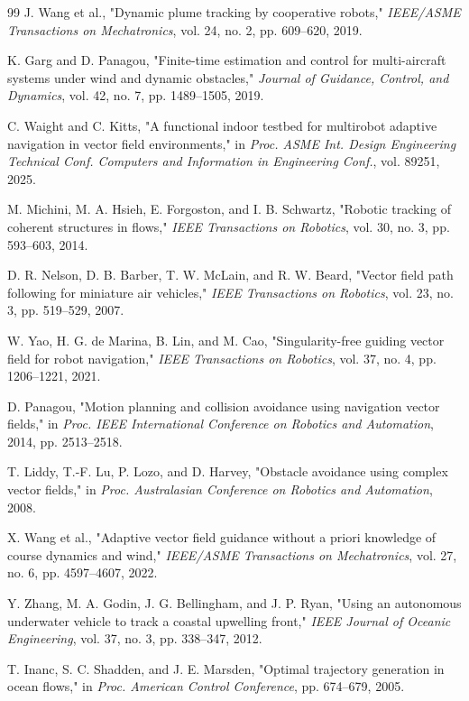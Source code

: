 \documentclass[lettersize,journal]{IEEEtran}
\begin{document}
\begin{thebibliography}{99}
 J. Wang et al., "Dynamic plume tracking by cooperative robots," \textit{IEEE/ASME Transactions on Mechatronics}, vol. 24, no. 2, pp. 609--620, 2019.

 K. Garg and D. Panagou, "Finite-time estimation and control for multi-aircraft systems under wind and dynamic obstacles," \textit{Journal of Guidance, Control, and Dynamics}, vol. 42, no. 7, pp. 1489--1505, 2019.

 C. Waight and C. Kitts, "A functional indoor testbed for multirobot adaptive navigation in vector field environments," in \textit{Proc. ASME Int. Design Engineering Technical Conf. Computers and Information in Engineering Conf.}, vol. 89251, 2025.

 M. Michini, M. A. Hsieh, E. Forgoston, and I. B. Schwartz, "Robotic tracking of coherent structures in flows," \textit{IEEE Transactions on Robotics}, vol. 30, no. 3, pp. 593--603, 2014.

 D. R. Nelson, D. B. Barber, T. W. McLain, and R. W. Beard, "Vector field path following for miniature air vehicles," \textit{IEEE Transactions on Robotics}, vol. 23, no. 3, pp. 519--529, 2007.

 W. Yao, H. G. de Marina, B. Lin, and M. Cao, "Singularity-free guiding vector field for robot navigation," \textit{IEEE Transactions on Robotics}, vol. 37, no. 4, pp. 1206--1221, 2021.

 D. Panagou, "Motion planning and collision avoidance using navigation vector fields," in \textit{Proc. IEEE International Conference on Robotics and Automation}, 2014, pp. 2513--2518.

 T. Liddy, T.-F. Lu, P. Lozo, and D. Harvey, "Obstacle avoidance using complex vector fields," in \textit{Proc. Australasian Conference on Robotics and Automation}, 2008.

 X. Wang et al., "Adaptive vector field guidance without a priori knowledge of course dynamics and wind," \textit{IEEE/ASME Transactions on Mechatronics}, vol. 27, no. 6, pp. 4597--4607, 2022.

 Y. Zhang, M. A. Godin, J. G. Bellingham, and J. P. Ryan, "Using an autonomous underwater vehicle to track a coastal upwelling front," \textit{IEEE Journal of Oceanic Engineering}, vol. 37, no. 3, pp. 338--347, 2012.

 T. Inanc, S. C. Shadden, and J. E. Marsden, "Optimal trajectory generation in ocean flows," in \textit{Proc. American Control Conference}, pp. 674--679, 2005.


\end{thebibliography}
\end{document}
